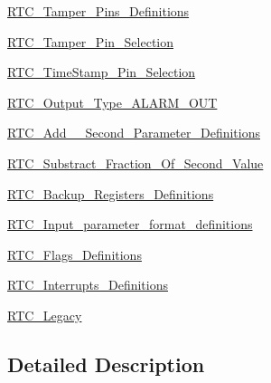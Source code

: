 \begin{DoxyCompactItemize}
\hyperlink{group___r_t_c___tamper___pins___definitions}{R\+T\+C\+\_\+\+Tamper\+\_\+\+Pins\+\_\+\+Definitions}
\item 
\hyperlink{group___r_t_c___tamper___pin___selection}{R\+T\+C\+\_\+\+Tamper\+\_\+\+Pin\+\_\+\+Selection}
\item 
\hyperlink{group___r_t_c___time_stamp___pin___selection}{R\+T\+C\+\_\+\+Time\+Stamp\+\_\+\+Pin\+\_\+\+Selection}
\item 
\hyperlink{group___r_t_c___output___type___a_l_a_r_m___o_u_t}{R\+T\+C\+\_\+\+Output\+\_\+\+Type\+\_\+\+A\+L\+A\+R\+M\+\_\+\+O\+U\+T}
\item 
\hyperlink{group___r_t_c___add__1___second___parameter___definitions}{R\+T\+C\+\_\+\+Add\+\_\+\_\+\+Second\+\_\+\+Parameter\+\_\+\+Definitions}
\item 
\hyperlink{group___r_t_c___substract___fraction___of___second___value}{R\+T\+C\+\_\+\+Substract\+\_\+\+Fraction\+\_\+\+Of\+\_\+\+Second\+\_\+\+Value}
\item 
\hyperlink{group___r_t_c___backup___registers___definitions}{R\+T\+C\+\_\+\+Backup\+\_\+\+Registers\+\_\+\+Definitions}
\item 
\hyperlink{group___r_t_c___input__parameter__format__definitions}{R\+T\+C\+\_\+\+Input\+\_\+parameter\+\_\+format\+\_\+definitions}
\item 
\hyperlink{group___r_t_c___flags___definitions}{R\+T\+C\+\_\+\+Flags\+\_\+\+Definitions}
\item 
\hyperlink{group___r_t_c___interrupts___definitions}{R\+T\+C\+\_\+\+Interrupts\+\_\+\+Definitions}
\item 
\hyperlink{group___r_t_c___legacy}{R\+T\+C\+\_\+\+Legacy}
\end{DoxyCompactItemize}


\subsection{Detailed Description}
